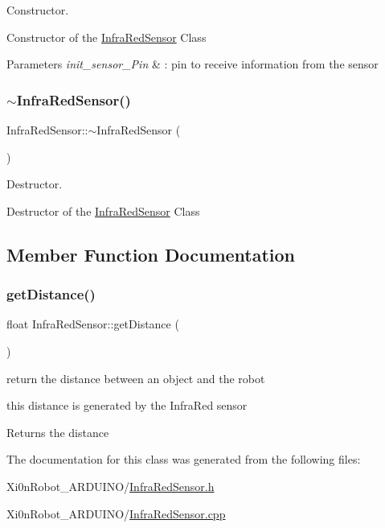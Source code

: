 Constructor. 

Constructor of the \hyperlink{class_infra_red_sensor}{Infra\+Red\+Sensor} Class\textquotesingle{}


\begin{DoxyParams}{Parameters}
{\em init\+\_\+sensor\+\_\+\+Pin} & \+: pin to receive information from the sensor \\
\hline
\end{DoxyParams}
\mbox{\label{class_infra_red_sensor_a0444b90b3740fe361388907ee7f9930f}} 
\subsubsection{\texorpdfstring{$\sim$\+Infra\+Red\+Sensor()}{~InfraRedSensor()}}
{\footnotesize\ttfamily Infra\+Red\+Sensor\+::$\sim$\+Infra\+Red\+Sensor (\begin{DoxyParamCaption}{ }\end{DoxyParamCaption})}



Destructor. 

Destructor of the \hyperlink{class_infra_red_sensor}{Infra\+Red\+Sensor} Class\textquotesingle{} 

\subsection{Member Function Documentation}
\mbox{\label{class_infra_red_sensor_a60ca6c269209278cac5da50e5a4fbc0a}} 
\subsubsection{\texorpdfstring{get\+Distance()}{getDistance()}}
{\footnotesize\ttfamily float Infra\+Red\+Sensor\+::get\+Distance (\begin{DoxyParamCaption}{ }\end{DoxyParamCaption})}



return the distance between an object and the robot 

this distance is generated by the Infra\+Red sensor

\begin{DoxyReturn}{Returns}
the distance 
\end{DoxyReturn}


The documentation for this class was generated from the following files\+:\begin{DoxyCompactItemize}
\item 
Xi0n\+Robot\+\_\+\+A\+R\+D\+U\+I\+N\+O/\hyperlink{_infra_red_sensor_8h}{Infra\+Red\+Sensor.\+h}\item 
Xi0n\+Robot\+\_\+\+A\+R\+D\+U\+I\+N\+O/\hyperlink{_infra_red_sensor_8cpp}{Infra\+Red\+Sensor.\+cpp}\end{DoxyCompactItemize}
